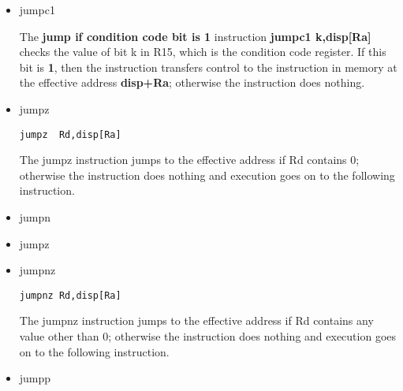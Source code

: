\documentclass[11pt]{article}
\begin{document}
\begin{itemize}
\item jumpc1
\label{sec:org32ab343}

The \textbf{\textbf{jump if condition code bit is 1}} instruction \textbf{jumpc1
k,disp[Ra]} checks the value of bit k in R15, which is the condition
code register.  If this bit is \textbf{1}, then the instruction transfers
control to the instruction in memory at the effective address
\textbf{disp+Ra}; otherwise the instruction does nothing.

\item jumpz
\label{sec:orge69b2f2}

\begin{verbatim}
jumpz  Rd,disp[Ra]
\end{verbatim}

The jumpz instruction jumps to the effective address if Rd contains 0;
otherwise the instruction does nothing and execution goes on to the
following instruction.

\item jumpn
\label{sec:org6b4caac}
\item jumpz
\label{sec:orgaf5e8c7}
\item jumpnz
\label{sec:orgc00f81c}

\begin{verbatim}
jumpnz Rd,disp[Ra]
\end{verbatim}

The jumpnz instruction jumps to the effective address if Rd contains
any value other than 0; otherwise the instruction does nothing and
execution goes on to the following instruction.

\item jumpp
\label{sec:org6acd454}
\end{itemize}
\end{document}
